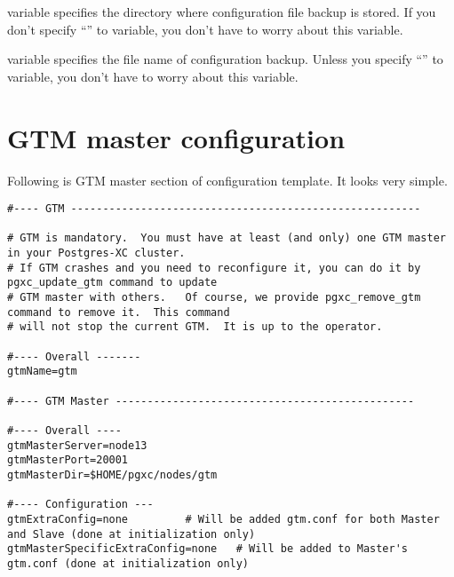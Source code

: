   
       variable specifies the directory where  configuration
	  file backup is stored.
      If you don't specify ``'' to  variable, you don't have to worry
	  about this variable.
  
  
       variable specifies the file name of  configuration backup.
      Unless you specify ``'' to  variable, you don't have to worry
	  about this variable.




\section{GTM master configuration}

  Following is GTM master section of  configuration template.
  It looks very simple.
  
  \begin{lstlisting}[frame=single]
#---- GTM -------------------------------------------------------

# GTM is mandatory.  You must have at least (and only) one GTM master in your Postgres-XC cluster.
# If GTM crashes and you need to reconfigure it, you can do it by pgxc_update_gtm command to update
# GTM master with others.   Of course, we provide pgxc_remove_gtm command to remove it.  This command
# will not stop the current GTM.  It is up to the operator.

#---- Overall -------
gtmName=gtm

#---- GTM Master -----------------------------------------------

#---- Overall ----
gtmMasterServer=node13
gtmMasterPort=20001
gtmMasterDir=$HOME/pgxc/nodes/gtm

#---- Configuration ---
gtmExtraConfig=none         # Will be added gtm.conf for both Master and Slave (done at initialization only)
gtmMasterSpecificExtraConfig=none   # Will be added to Master's gtm.conf (done at initialization only)
  \end{lstlisting}
  
  
